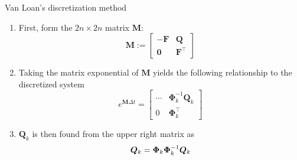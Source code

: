     \begin{algorithm}[!htbp]
        \caption{Van Loan's discretization method}
	    \label{alg:vanloan}
        \begin{minipage}{\dimexpr\textwidth-2\algomargin\relax}
            \begin{enumerate}
            \item First, form the $2n\times2n$ matrix $\bm{M}$:
            \begin{equation}
                \mathbf{M} := \left[\begin{array}{cc}-\mathbf{F} & {\mathbf{Q}} \\ {\mathbf{0}} & {\mathbf{F}^{\top}}\end{array}\right]
            \end{equation}
            \item Taking the matrix exponential of $\bm{M}$ yields the following relationship to the discretized system
            \begin{equation}
                e^{\mathbf{M} \Delta t} = \left[ \begin{array}{cc}{\cdots} & {\bm{\Phi}_{k}^{-1} \mathbf{Q}_{k}} \\ {0} & {\bm{\Phi}_{k}^{\top}}\end{array}\right]
            \end{equation}
            \item $\bm{Q}_k$ is then found from the upper right matrix as
            \begin{equation}
                \bm{Q}_k = \bm{\Phi}_k\bm{\Phi}_k^{-1}\bm{Q}_k
            \end{equation}
            \end{enumerate}
            \vspace{0.1cm}
        \end{minipage}
    \end{algorithm}






          
    
